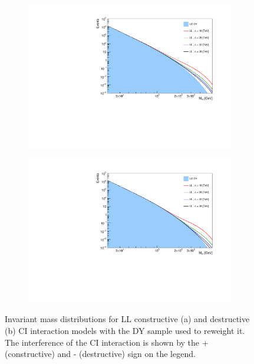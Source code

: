 \begin{figure}[]
    \centering
    \begin{subfigure}[b]{0.49\textwidth}
        \centering
        \includegraphics[width=\textwidth]{figures/analysis/datamc/sigmodel/constSigsOverlay.pdf}
        \caption{}
        \label{fig:datamc:sigconstoverlays}
    \end{subfigure}
    \begin{subfigure}[b]{0.49\textwidth}
        \centering
        \includegraphics[width=\textwidth]{figures/analysis/datamc/sigmodel/destSigsOverlay.pdf}
        \caption{}
        \label{fig:datamc:sigdestoverlays}
    \end{subfigure}
    \caption[Invariant mass distribution for reweighted CI LL signal models]{Invariant mass distributions for LL constructive (a) and destructive (b) CI interaction models with the DY sample used to reweight it. The interference of the CI interaction is shown by the + (constructive) and - (destructive) sign on the legend.}
    \label{fig:datamc:sigoverlays}
\end{figure}

